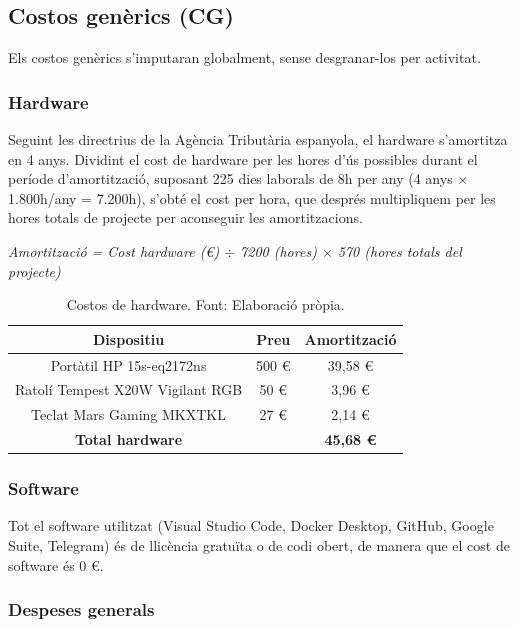 \documentclass[12pt,a4paper,twoside]{report}
\begin{document}
\subsection{Costos gen\`erics (CG)}
\label{subsec:cg}

Els costos gen\`erics s'imputaran globalment, sense desgranar-los per activitat.

\subsubsection{Hardware}

Seguint les directrius de la Ag\`encia Tribut\`aria espanyola, el hardware s'amortitza en 4 anys. Dividint el cost de hardware per les hores d'\'us possibles durant el per\'iode d'amortitzaci\'o, suposant 225 dies laborals de 8h per any (4 anys $\times$ 1.800h/any = 7.200h), s'obt\'e el cost per hora, que despr\'es multipliquem per les hores totals de projecte per aconseguir les amortitzacions.

\textit{Amortitzaci\'o = Cost hardware (\euro) $\div$ 7200 (hores) $\times$ 570 (hores totals del projecte)}

\begin{table}[H]
\centering
\caption{Costos de hardware. Font: Elaboraci\'o pr\`opia.}
\label{tab:hardware}
\begin{tabular}{@{}ccc@{}}
\toprule
\textbf{Dispositiu} & \textbf{Preu} & \textbf{Amortitzaci\'o} \\
\midrule
Port\`atil HP 15s-eq2172ns & 500 \euro & 39,58 \euro \\
Ratol\'i Tempest X20W Vigilant RGB & 50 \euro & 3,96 \euro \\
Teclat Mars Gaming MKXTKL & 27 \euro & 2,14 \euro \\
\midrule
\textbf{Total hardware} & & \textbf{45,68 \euro} \\
\bottomrule
\end{tabular}
\end{table}

\subsubsection{Software}

Tot el software utilitzat (Visual Studio Code, Docker Desktop, GitHub, Google Suite, Telegram) \'es de llic\`encia gratu\"ita o de codi obert, de manera que el cost de software \'es 0 \euro.

\subsubsection{Despeses generals}
\end{document}
